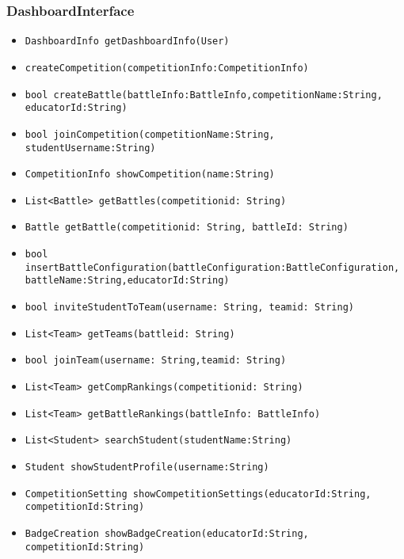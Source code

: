 \subsubsection{DashboardInterface}
\begin{itemize}
    \item \texttt{DashboardInfo getDashboardInfo(User)}%
    \item \texttt{createCompetition(competitionInfo:CompetitionInfo)}%
    \item \texttt{bool createBattle(battleInfo:BattleInfo,competitionName:String,\\educatorId:String)}%
    \item \texttt{bool joinCompetition(competitionName:String, studentUsername:String)}%
    \item \texttt{CompetitionInfo showCompetition(name:String)}%
    \item \texttt{List<Battle> getBattles(competitionid: String)}%
    \item \texttt{Battle getBattle(competitionid: String, battleId: String)}
    \item \texttt{bool insertBattleConfiguration(battleConfiguration:BattleConfiguration, \\battleName:String,educatorId:String)}%
    \item \texttt{bool inviteStudentToTeam(username: String, teamid: String)}%
    \item \texttt{List<Team> getTeams(battleid: String)}%
    \item \texttt{bool joinTeam(username: String,teamid: String)}%
    \item \texttt{List<Team> getCompRankings(competitionid: String)}
    \item \texttt{List<Team> getBattleRankings(battleInfo: BattleInfo)}
    \item \texttt{List<Student> searchStudent(studentName:String)}%
    \item \texttt{Student showStudentProfile(username:String)}%
    \item \texttt{CompetitionSetting showCompetitionSettings(educatorId:String,\\competitionId:String)}%
    \item \texttt{BadgeCreation showBadgeCreation(educatorId:String,\\competitionId:String)}%

\end{itemize}
